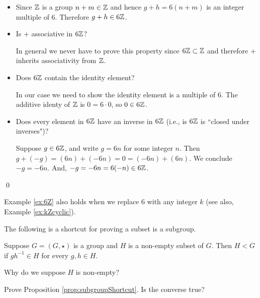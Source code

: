 \documentclass[../algebraNotesMSRI-UP2016.tex]{subfiles}
\begin{document}
\begin{frame}
\begin{itemize}
\item[] Since $\mathbb Z$ is a group $n+m\in\mathbb Z$ and hence $g+h=6(n+m)$ is an integer multiple of $6$.  Therefore $g+h\in 6\mathbb Z$.
\item Is $+$ associative in $6\mathbb Z$?  

\smallGap
In general we never have to prove this property since $6\mathbb Z\subset \mathbb Z$ and therefore $+$ inherits associativity from $\mathbb Z$.
\item Does $6\mathbb Z$ contain the identity element?

\smallGap
In our case we need to show the identity element is a multiple of $6$.  The additive identy of $\mathbb Z$ is $0=6\cdot 0$, so $0\in 6\mathbb Z$.
\item Does every element in $6\mathbb Z$ have an inverse in $6\mathbb Z$ (i.e., is $6\mathbb Z$ is ``closed under inverses")?

\smallGap
Suppose $g\in 6\mathbb Z$, and write $g=6n$ for some integer $n$.  Then $g+(-g)=(6n)+(-6n)=0=(-6n)+(6n)$.  We conclude $-g=-6n$.  And, $-g=-6n=6(-n)\in 6\mathbb Z$.
\end{itemize}
\qed
\end{frame}

\begin{frame}[c]
Example \ref{ex:6Z} also holds when we replace $6$ with any integer $k$ (see also, Example \ref{ex:kZcyclic}).  
\end{frame}

\begin{frame}[c]
The following is a shortcut for proving a subset is a subgroup.

\smallGap
\begin{prop}\label{prop:subgroupShortcut}
Suppose $G=(G,\star)$ is a group and $H$ is a non-empty subset of $G$.  Then $H< G$ if $gh^{-1}\in H$ for every $g,h\in H$. 
\end{prop}

\smallGap
\begin{que}
Why do we suppose $H$ is non-empty?
\end{que}

\smallGap
\begin{exe}\label{exe:subgroupShortcut}
Prove Proposition \ref{prop:subgroupShortcut}.  Is the converse true?
\end{exe}
\end{frame}
\end{document}
